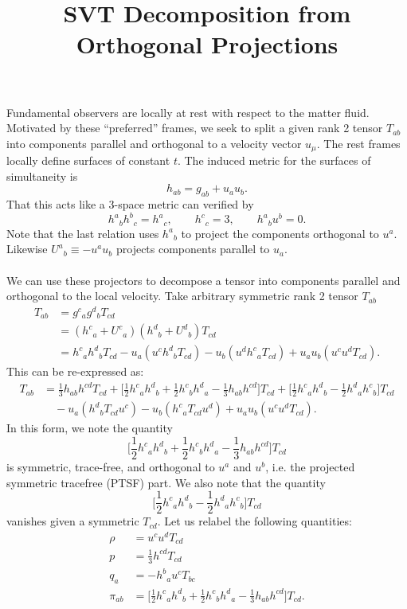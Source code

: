 \documentclass[10pt,letterpaper]{article}
\title{SVT Decomposition from Orthogonal Projections}
\author{}
\date{}
\begin{document}
\maketitle
Fundamental observers are locally at rest with respect to the matter fluid. Motivated by these ``preferred'' frames, we seek to split a given rank 2 tensor $T_{ab}$ into components parallel and orthogonal to a velocity vector $u_\mu$. The rest frames locally define surfaces of constant $t$. The induced metric for the surfaces of simultaneity is
\[
	h_{ab} = g_{ab} + u_a u_b.
\]
That this acts like a 3-space metric can verified by
\[
	h^a{}_b h^b{}_c =  h^a{}_c,\qquad h^c{}_c = 3, \qquad h^a{}_b u^b = 0.
\]
Note that the last relation uses $h^a{}_b$ to project the components orthogonal to $u^a$.  Likewise $U^a{}_b \equiv -u^au_b$ projects components parallel to $u_a$. \\ \\
We can use these projectors to decompose a tensor into components parallel and orthogonal to the local velocity. Take arbitrary symmetric rank 2 tensor $T_{ab}$
\begin{align}
	T_{ab} &= g^c{}_a g^d{}_b T_{cd}\\
	&= (h^c{}_a + U^c{}_a{})(h^d{}_b + U^d{}_b{})T_{cd}\\
	&= h^c{}_a h^d{}_b T_{cd} - u_a(u^c h^d{}_b T_{cd}) - u_b (u^d h^c{}_a T_{cd}) + u_a u_b (u^c u^d T_{cd}) .
\end{align}
This can be re-expressed as:
\begin{align}
	T_{ab}&= \frac13 h_{ab}h^{cd}T_{cd} + \bigg[ \frac12 h^c{}_a h^d{}_b+\frac12 h^c{}_b h^d{}_a - \frac13 h_{ab}h^{cd}\bigg] T_{cd}
+\bigg[\frac12 h^c{}_a h^d{}_{b}-\frac12 h^d{}_a h^c{}_{b}\bigg]T_{cd} \\
	&\quad - u_a(h^d{}_b T_{cd}u^c ) - u_b ( h^c{}_a T_{cd}u^d) + u_a u_b (u^c u^d T_{cd}).
\end{align}
In this form, we note the quantity
\[
	  \bigg[ \frac12 h^c{}_a h^d{}_b+\frac12 h^c{}_b h^d{}_a - \frac13 h_{ab}h^{cd}\bigg] T_{cd}
\]
is symmetric, trace-free, and orthogonal to $u^a$ and $u^b$, i.e. the projected symmetric tracefree (PTSF) part. 
We also note that the quantity
\begin{equation}
	\bigg[\frac12 h^c{}_a h^d{}_{b}-\frac12 h^d{}_a h^c{}_{b}\bigg]T_{cd}
\end{equation}
vanishes given a symmetric $T_{cd}$. 
Let us relabel the following quantities:
\begin{align}
	\rho &= u^cu^dT_{cd}\\
	p &= \frac13 h^{cd}T_{cd}\\
	q_a &  = -h^b{}_a{} u^c  T_{bc} \\
	\pi_{ab} &=  \bigg[ \frac12 h^c{}_a h^d{}_b+\frac12 h^c{}_b h^d{}_a - \frac13 h_{ab}h^{cd}\bigg] T_{cd}.
\end{align}
\end{document}
